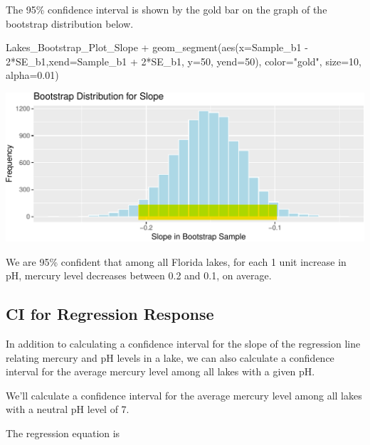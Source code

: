 \documentclass[
  letterpaper,
  DIV=11,
  numbers=noendperiod]{scrreprt}
\newenvironment{Shaded}{\begin{snugshade}}{\end{snugshade}}
\newcommand{\AttributeTok}[1]{\textcolor[rgb]{0.40,0.45,0.13}{#1}}
\newcommand{\DecValTok}[1]{\textcolor[rgb]{0.68,0.00,0.00}{#1}}
\newcommand{\FloatTok}[1]{\textcolor[rgb]{0.68,0.00,0.00}{#1}}
\newcommand{\FunctionTok}[1]{\textcolor[rgb]{0.28,0.35,0.67}{#1}}
\newcommand{\NormalTok}[1]{\textcolor[rgb]{0.00,0.23,0.31}{#1}}
\newcommand{\SpecialCharTok}[1]{\textcolor[rgb]{0.37,0.37,0.37}{#1}}
\newcommand{\StringTok}[1]{\textcolor[rgb]{0.13,0.47,0.30}{#1}}
\begin{document}
The 95\% confidence interval is shown by the gold bar on the graph of
the bootstrap distribution below.

\begin{Shaded}
\begin{Highlighting}[]
\NormalTok{Lakes\_Bootstrap\_Plot\_Slope }\SpecialCharTok{+} 
  \FunctionTok{geom\_segment}\NormalTok{(}\FunctionTok{aes}\NormalTok{(}\AttributeTok{x=}\NormalTok{Sample\_b1 }\SpecialCharTok{{-}} \DecValTok{2}\SpecialCharTok{*}\NormalTok{SE\_b1,}\AttributeTok{xend=}\NormalTok{Sample\_b1 }\SpecialCharTok{+} \DecValTok{2}\SpecialCharTok{*}\NormalTok{SE\_b1, }\AttributeTok{y=}\DecValTok{50}\NormalTok{, }\AttributeTok{yend=}\DecValTok{50}\NormalTok{), }
               \AttributeTok{color=}\StringTok{"gold"}\NormalTok{, }\AttributeTok{size=}\DecValTok{10}\NormalTok{, }\AttributeTok{alpha=}\FloatTok{0.01}\NormalTok{) }
\end{Highlighting}
\end{Shaded}

\includegraphics{Ch3_files/figure-pdf/unnamed-chunk-127-1.pdf}

We are 95\% confident that among all Florida lakes, for each 1 unit
increase in pH, mercury level decreases between 0.2 and 0.1, on average.

\subsection{CI for Regression
Response}\label{ci-for-regression-response}

In addition to calculating a confidence interval for the slope of the
regression line relating mercury and pH levels in a lake, we can also
calculate a confidence interval for the average mercury level among all
lakes with a given pH.

We'll calculate a confidence interval for the average mercury level
among all lakes with a neutral pH level of 7.

The regression equation is
\end{document}

